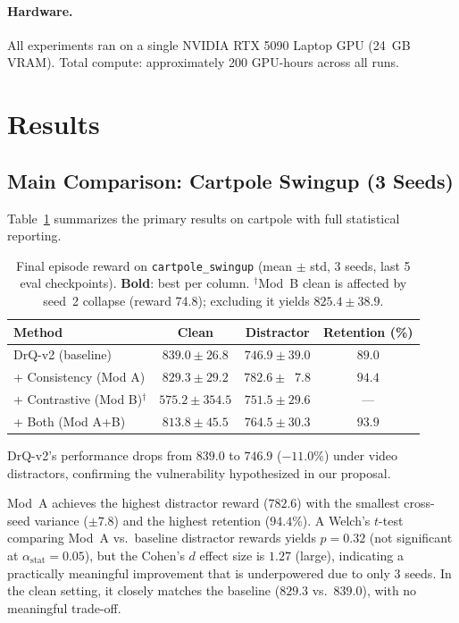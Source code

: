\documentclass{article}
\begin{document}
\paragraph{Hardware.}
All experiments ran on a single NVIDIA RTX 5090 Laptop GPU (24~GB VRAM).
Total compute: approximately 200 GPU-hours across all runs.

\section{Results}
\label{sec:results}

\subsection{Main Comparison: Cartpole Swingup (3 Seeds)}

Table~\ref{tab:cartpole} summarizes the primary results on cartpole with full statistical reporting.

\begin{table}[h]
\centering
\caption{Final episode reward on \texttt{cartpole\_swingup} (mean $\pm$ std, 3 seeds, last 5 eval checkpoints). \textbf{Bold}: best per column. $^\dagger$Mod~B clean is affected by seed~2 collapse (reward 74.8); excluding it yields $825.4 \pm 38.9$.}
\label{tab:cartpole}
\begin{tabular}{lccc}
\toprule
\textbf{Method} & \textbf{Clean} & \textbf{Distractor} & \textbf{Retention (\%)} \\
\midrule
DrQ-v2 (baseline)       & $\mathbf{839.0 \pm 26.8}$ & $746.9 \pm 39.0$ & $89.0$ \\
+ Consistency (Mod A)   & $829.3 \pm 29.2$ & $\mathbf{782.6 \pm \;\;7.8}$ & $\mathbf{94.4}$ \\
+ Contrastive (Mod B)$^\dagger$   & $575.2 \pm 354.5$ & $751.5 \pm 29.6$ & --- \\
+ Both (Mod A+B)        & $813.8 \pm 45.5$ & $764.5 \pm 30.3$ & $93.9$ \\
\bottomrule
\end{tabular}
\end{table}

DrQ-v2's performance drops from $839.0$ to $746.9$ ($-11.0\%$) under video distractors, confirming the vulnerability hypothesized in our proposal.

Mod~A achieves the highest distractor reward ($782.6$) with the smallest cross-seed variance ($\pm 7.8$) and the highest retention ($94.4\%$).
A Welch's $t$-test comparing Mod~A vs.\ baseline distractor rewards yields $p=0.32$ (not significant at $\alpha_{\text{stat}}=0.05$), but the Cohen's $d$ effect size is $1.27$ (large), indicating a practically meaningful improvement that is underpowered due to only 3 seeds.
In the clean setting, it closely matches the baseline ($829.3$ vs.\ $839.0$), with no meaningful trade-off.
\end{document}
